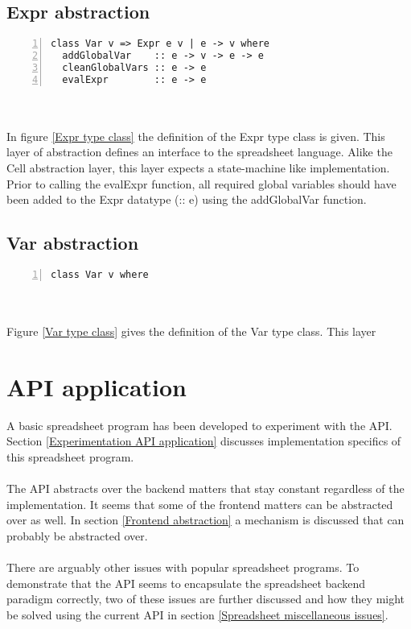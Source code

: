 \documentclass[10pt,a4paper]{article}
\begin{document}
\subsection{Expr abstraction}
\label{Expr abstraction}
\begin{minipage}{\linewidth}
\begin{Verbatim}[numbers=left,stepnumber=1,numbersep=5pt]
class Var v => Expr e v | e -> v where
  addGlobalVar    :: e -> v -> e -> e
  cleanGlobalVars :: e -> e
  evalExpr        :: e -> e
\end{Verbatim}
\label{Expr type class}
\end{minipage}
\\\\
In figure \ref{Expr type class} the definition of the Expr type class is given. This layer
of abstraction defines an interface to the spreadsheet language. Alike the Cell abstraction layer,
this layer expects a state-machine like implementation. Prior to calling the evalExpr function,
all required global variables should have been added to the Expr datatype (:: e) using the
addGlobalVar function.

\subsection{Var abstraction}
\label{Var abstraction}
\begin{minipage}{\linewidth}
\begin{Verbatim}[numbers=left,stepnumber=1,numbersep=5pt]
class Var v where
\end{Verbatim}
\label{Var type class}
\end{minipage}
\\\\
Figure \ref{Var type class} gives the definition of the Var type class.
This layer

\section{API application}
\label{API application}
A basic spreadsheet program has been developed to experiment with the API.
Section \ref{Experimentation API application} discusses implementation specifics of this
spreadsheet program.
\\\\
The API abstracts over the backend matters that stay constant regardless of the implementation.
It seems that some of the frontend matters can be abstracted over as well. In section
\ref{Frontend abstraction} a mechanism is discussed that can probably be abstracted over.
\\\\
There are arguably other issues with popular spreadsheet programs. To demonstrate that the API
seems to encapsulate the spreadsheet backend paradigm correctly, two of these issues are further
discussed and how they might be solved using the current API in section \ref{Spreadsheet miscellaneous issues}.
\end{document}
